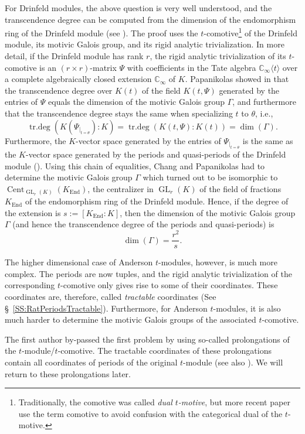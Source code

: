 \documentclass[10pt,a4paper]{amsart}
\theoremstyle{plain} %
\theoremstyle{definition}
\theoremstyle{remark}
\newcommand{\CC}{\mathbb{C}}
\newcommand{\End}{\operatorname{End}}
\newcommand{\trdeg}{\operatorname{tr.deg}}
\newcommand{\GL}{\operatorname{GL}}
\newcommand{\KI}{\mathbb{K}_{\infty}}  %
\newcommand{\CI}{\CC_{\infty}}  %
\newcommand{\cs}[1]{\langle #1 \rangle} %
\newcommand{\Cent}{\operatorname{Cent}}
\numberwithin{equation}{subsection}
\begin{document}
For Drinfeld modules, the above question is very well understood, and the transcendence degree can be computed from the dimension of the endomorphism ring of the Drinfeld module (see \cite{cc-mp:arplr2dm,cc-mp:aipldm}). The proof uses the $t$-comotive\footnote{Traditionally, the comotive was called \emph{dual $t$-motive}, but more recent paper use the term comotive to avoid confusion with the categorical dual of the $t$-motive.} of the Drinfeld module, its motivic Galois group, and its rigid analytic trivialization. In more detail, if the Drinfeld module has rank $r$, the rigid analytic trivialization of its $t$-comotive is an $(r\times r)$-matrix $\Psi$ with coefficients in the Tate algebra $\CI\cs{t}$ over a complete algebraically closed extension $\CI$ of $K$. Papanikolas showed in \cite[Theorem 1.1.7]{mp:tdadmaicl} that the transcendence degree over $K(t)$ of the field $K(t,\Psi)$ generated by the entries of $\Psi$ equals the dimension of the motivic Galois group $\Gamma$, and furthermore that the transcendence degree stays the same when specializing $t$ to $\theta$, i.e.,~
\[ \trdeg(K(\Psi_{|_{t=\theta}}):K)=\trdeg(K(t,\Psi):K(t))= \dim(\Gamma).\]
Furthermore, the $K$-vector space generated by the entries of $\Psi_{|_{t=\theta}}$ is the same as the $K$-vector space generated by the periods and quasi-periods of the Drinfeld module (\cite[Prop.~3.4.7]{cc-mp:aipldm}).
Using this chain of equalities, Chang and Papanikolas had to determine the motivic Galois group $\Gamma$ which turned out to be isomorphic to $\Cent_{\GL_r(K)}(K_{\End})$, the centralizer in $\GL_r(K)$ of the field of fractions $K_{\End}$ of the endomorphism ring of the Drinfeld module. Hence, if the degree of the extension is $s:=[K_{\End}:K]$, then the dimension of the motivic Galois group $\Gamma$ (and hence the transcendence degree of the periods and quasi-periods) is 
\[ \dim(\Gamma)= \frac{r^2}{s}. \]

\medskip

The higher dimensional case of Anderson $t$-modules, however, is much more complex. 
The periods are now tuples, and the rigid analytic trivialization of the corresponding $t$-comotive only gives rise to some of their coordinates. These coordinates are, therefore, called \emph{tractable} coordinates (See \S~\ref{SS:RatPeriodsTractable}).
Furthermore, for Anderson $t$-modules, it is also much harder to determine the motivic Galois groups of the associated $t$-comotive.



The first author \cite{am:ptmsv} by-passed the first problem by using so-called prolongations of the $t$-module/$t$-comotive. The tractable coordinates of these prolongations contain all coordinates of periods of the original $t$-module (see also \cite[Theorem F]{cn-mp:hpqpam}). We will return to these prolongations later.
\end{document}

